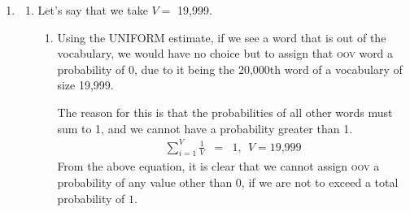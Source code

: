 \documentclass[11pt]{article}
\begin{document}
\begin{enumerate}
\begin{enumerate}[label=(\alph*)]
		\begin{figure}[htb]
		\end{figure}
	\end{enumerate}

\newpage
\item %
	\begin{enumerate}[label=(\alph*)]
	\item %
		Let's say that we take $V =$ 19,999. 

		\begin{enumerate}[label=\roman*.]
		\item
			Using the UNIFORM estimate, if we see a word that is out of the vocabulary, we would have no choice but to assign that \textsc{oov} word a probability of 0, due to it being the 20,000th word of a vocabulary of size 19,999. 

			The reason for this is that the probabilities of all other words must sum to 1, and we cannot have a probability greater than 1.
			\begin{eqnarray*}
				\sum\limits_{i=1}^{V}{\frac{1}{V}} &=& 1 , \ \ V = \text{19,999}
			\end{eqnarray*}
			From the above equation, it is clear that we cannot assign \textsc{oov} a probability of any value other than $0$, if we are not to exceed a total probability of $1$.


\end{enumerate}
\end{enumerate}
\end{enumerate}
\end{document}
